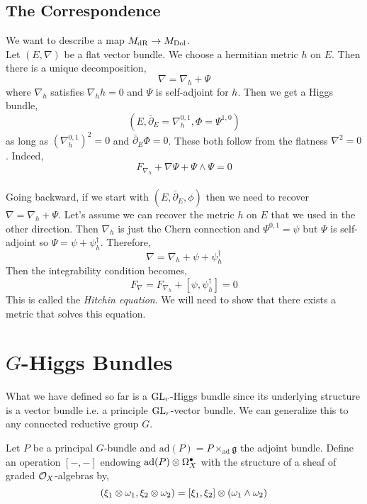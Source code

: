 \documentclass[12pt]{article}
\begin{document}
\subsection{The Correspondence}


\newcommand{\dbar}{\bar{\partial}}
\newcommand{\hol}{\mathrm{hol}}

We want to describe a map $M_{\mathrm{dR}} \to M_{\mathrm{Dol}}$. 
\bigskip\\
Let $(E, \nabla)$ be a flat vector bundle. We choose a hermitian metric $h$ on $E$. Then there is a unique decomposition,
\[ \nabla = \nabla_h + \Psi \]
where $\nabla_h$ satisfies $\nabla_h h = 0$ and $\Psi$ is self-adjoint for $h$. Then we get a Higgs bundle,
\[ (E, \dbar_E = \nabla_h^{0,1}, \Phi = \Psi^{1,0}) \]
as long as $(\nabla_h^{0,1})^2 = 0$  and $\dbar_E \Phi = 0$. These both follow from the flatness $\nabla^2 = 0$. Indeed,
\[ F_{\nabla_h} + \nabla \Psi + \Psi \wedge \Psi = 0 \] 
\bigskip\\
Going backward, if we start with $(E, \dbar_E, \phi)$ then we need to recover $\nabla = \nabla_h + \Psi$. Let's assume we can recover the metric $h$ on $E$ that we used in the other direction. Then $\nabla_h$ is just the Chern connection and $\Psi^{0,1} = \psi$ but $\Psi$ is self-adjoint so $\Psi = \psi + \psi^{\dagger}_h$. Therefore,
\[ \nabla = \nabla_h + \psi + \psi^{\dagger}_h \]
Then the integrability condition becomes,
\[ F_{\nabla} = F_{\nabla_h} + [\psi, \psi^{\dagger}_h] = 0 \]
This is called the \textit{Hitchin equation}. We will need to show that there exists a metric that solves this equation. 

\section{$G$-Higgs Bundles}

What we have defined so far is a $\mathrm{GL}_r$-Higgs bundle since its underlying structure is a vector bundle i.e. a principle $\mathrm{GL}_r$-vector bundle. We can generalize this to any connected reductive group $G$. 


\newcommand{\ad}{\mathrm{ad}}
\newcommand{\g}{\mathfrak{g}}

\begin{defn}
Let $P$ be a principal $G$-bundle and $\ad(P) = P \times_{\ad} \g$ the adjoint bundle. Define an operation $[-,-]$ endowing $\ad(P) \ot \Omega^{\bullet}_X$ with the structure of a sheaf of graded $\mathcal{O}_{X}$-algebras by,
\[ (\xi_1 \otimes \omega_1, \xi_2 \otimes \omega_2) = [\xi_1, \xi_2] \otimes (\omega_1 \wedge \omega_2)  \]
\end{defn}
\end{document}
